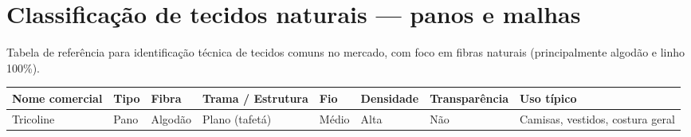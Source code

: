 \documentclass[
  10pt,oneside]{article}
\author{Helena Regina Salomé D'Espindula}
\date{2026-02-17}
\begin{document}
{
\setcounter{tocdepth}{2}
\tableofcontents
}
\section{Classificação de tecidos naturais --- panos e malhas}\label{classificauxe7uxe3o-de-tecidos-naturais-panos-e-malhas}

Tabela de referência para identificação técnica de tecidos comuns no mercado, com foco em fibras naturais (principalmente algodão e linho 100\%).

\begin{longtable}[]{@{}
  >{\raggedright\arraybackslash}p{}
  >{\raggedright\arraybackslash}p{}
  >{\raggedright\arraybackslash}p{}
  >{\raggedright\arraybackslash}p{}
  >{\raggedright\arraybackslash}p{}
  >{\raggedright\arraybackslash}p{}
  >{\raggedright\arraybackslash}p{}
  >{\raggedright\arraybackslash}p{}@{}}
\toprule\noalign{}
\begin{minipage}[b]{\linewidth}\raggedright
Nome comercial
\end{minipage} & \begin{minipage}[b]{\linewidth}\raggedright
Tipo
\end{minipage} & \begin{minipage}[b]{\linewidth}\raggedright
Fibra
\end{minipage} & \begin{minipage}[b]{\linewidth}\raggedright
Trama / Estrutura
\end{minipage} & \begin{minipage}[b]{\linewidth}\raggedright
Fio
\end{minipage} & \begin{minipage}[b]{\linewidth}\raggedright
Densidade
\end{minipage} & \begin{minipage}[b]{\linewidth}\raggedright
Transparência
\end{minipage} & \begin{minipage}[b]{\linewidth}\raggedright
Uso típico
\end{minipage} \\
\midrule\noalign{}
\endhead
\bottomrule\noalign{}
\endlastfoot
Tricoline & Pano & Algodão & Plano (tafetá) & Médio & Alta & Não & Camisas, vestidos, costura geral \\

\end{longtable}
\end{document}
